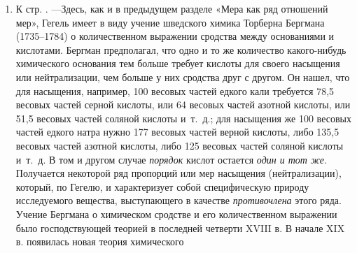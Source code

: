 \begin{enumerate}
эмпирического коэфициента, который в той или иной форме входит в уравнения
механики и физики. В качестве примера такой константы Гегель в следующей
фразе приводит величину $а$ в уравнении движения падения тел 
$s=at^2$. Гораздо чаще формулу движения падения тел
выражают уравнением $s=\frac 1 2 gt^2$, где константа
$g$ (постоянное для данного географического пункта ускорение силы
тяжести) равна приблизительно $9,8 \text{\em м}$ (в качестве единицы времени
берется при этом секунда). Следовательно, величина $а$ в уравнении
равна приблизительно $4,9 \text{\em м}$. Впрочем, надо сказать, что величина
$а$ или $g$, входящая в формулу движения падения тел, может
быть названа константою лишь в весьма относительном смысле. Дело в том, что
сама она изменяется с изменением расстояния от центра земного шара (а также
от расположения тяжелых масс на земной поверхности вблизи того места, где
производятся опыты с падением тел). Но так как эти изменения весьма
незначительны в тех случаях падения тел, которые рассматриваются в
элементарной механике (т.~е. в тех случаях, где расстояния, проходимые
падающим телом, незначительны по сравнению с длиной земного радиуса, причем
опыты производятся в одном и том же месте земной поверхности), то ими
вполне можно пренебречь.
\item \label{bkm:Ref474666676}К стр. \pageref{bkm:bm63}. —Здесь, как и в
предыдущем разделе «Мера как ряд отношений мер», Гегель имеет в виду учение
шведского химика Торберна Бергмана (1735–1784) о количественном выражении
сродства между основаниями и кислотами. Бергман предполагал, что одно и то
же количество какого-нибудь химического основания тем больше требует
кислоты для своего насыщения или нейтрализации, чем больше у них сродства
друг с другом. Он нашел, что для насыщения, например, 100 весовых частей
едкого кали требуется 78,5 весовых частей серной кислоты, или 64 весовых
частей азотной кислоты, или 51,5 весовых частей соляной кислоты и~т.~д.;
для насыщения же 100 весовых частей едкого натра нужно 177 весовых частей
верной кислоты, либо 135,5 весовых частей азотной кислоты, либо 125 весовых
частей соляной кислоты и~т.~д. В том и другом случае {\em порядок}
кислот остается {\em один и тот же}. Получается некоторой ряд пропорций
или мер насыщения (нейтрализации), который, по Гегелю, и характеризует
собой специфическую природу исследуемого вещества, выступающего в качестве
{\em противочлена} этого ряда. Учение Бергмана о химическом сродстве и
его количественном выражении было господствующей теорией в последней
четверти XVIII в. В начале XIX в. появилась новая теория химического

\end{enumerate}
